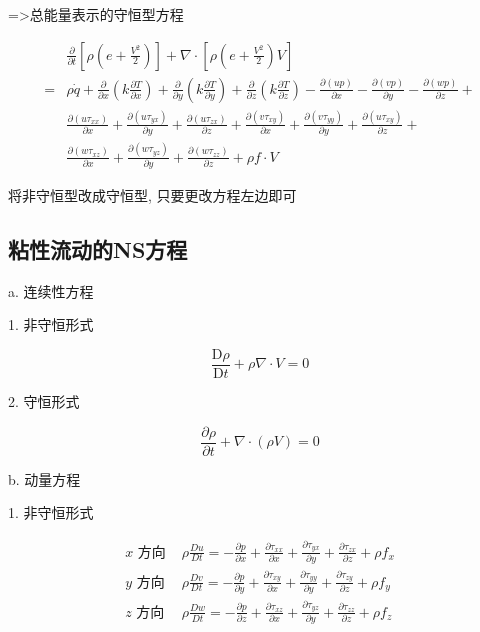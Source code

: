 \documentclass[UTF8]{ctexart}
\begin{document}
=>总能量表示的守恒型方程

$$
	\begin{aligned}
		  & \frac{\partial}{\partial t}\left[\rho\left(e+\frac{V^{2}}{2}\right)\right]+\nabla \cdot\left[\rho\left(e+\frac{V^{2}}{2}\right) V\right]                                                                                                                                                                                                 \\
		= & \rho \dot{q}+\frac{\partial}{\partial x}\left(k \frac{\partial T}{\partial x}\right)+\frac{\partial}{\partial y}\left(k \frac{\partial T}{\partial y}\right)+\frac{\partial}{\partial z}\left(k \frac{\partial T}{\partial z}\right)-\frac{\partial(u p)}{\partial x}-\frac{\partial(v p)}{\partial y}-\frac{\partial(w p)}{\partial z}+ \\
		  & \frac{\partial\left(u \tau_{x x}\right)}{\partial x}+\frac{\partial\left(u \tau_{y x}\right)}{\partial y}+\frac{\partial\left(u \tau_{z x}\right)}{\partial z}+\frac{\partial\left(v \tau_{x y}\right)}{\partial x}+\frac{\partial\left(v \tau_{y y}\right)}{\partial y}+\frac{\partial\left(u \tau_{x y}\right)}{\partial z}+           \\
		  & \frac{\partial\left(w \tau_{x z}\right)}{\partial x}+\frac{\partial\left(w \tau_{y z}\right)}{\partial y}+\frac{\partial\left(w \tau_{z z}\right)}{\partial z}+\rho f \cdot V
	\end{aligned}
$$

将非守恒型改成守恒型, 只要更改方程左边即可

\subsection{粘性流动的NS方程}
a. 连续性方程

1. 非守恒形式

$$
	\frac{\mathrm{D} \rho}{\mathrm{D} t}+\rho \nabla \cdot V=0
$$

2. 守恒形式


$$
	\frac{\partial \rho}{\partial t}+\nabla \cdot(\rho V)=0
$$

b. 动量方程

1. 非守恒形式

$$
	\begin{array}{ll}
		x \text { 方向 } & \rho \frac{D u}{D t}=-\frac{\partial p}{\partial x}+\frac{\partial \tau_{x x}}{\partial x}+\frac{\partial \tau_{y x}}{\partial y}+\frac{\partial \tau_{z x}}{\partial z}+\rho f_{x} \\
		y \text { 方向 } & \rho \frac{D v}{D t}=-\frac{\partial p}{\partial y}+\frac{\partial \tau_{x y}}{\partial x}+\frac{\partial \tau_{y y}}{\partial y}+\frac{\partial \tau_{z y}}{\partial z}+\rho f_{y} \\
		z \text { 方向 } & \rho \frac{D w}{D t}=-\frac{\partial p}{\partial z}+\frac{\partial \tau_{x z}}{\partial x}+\frac{\partial \tau_{y z}}{\partial y}+\frac{\partial \tau_{z z}}{\partial z}+\rho f_{z}
	\end{array}
$$
\end{document}
